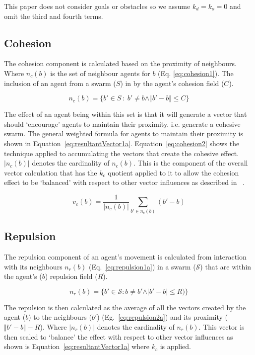 \documentclass[12pt,a4paper]{IEEEtran}
\newcommand{\magn}[1]{\Vert{#1}\Vert}
\newcommand{\card}[1]{\vert{#1}\vert}
\newcommand{\vbb}[2]{#2-#1}
\newcommand{\kc}{\mathit{k_c}}
\newcommand{\kd}{\mathit{k_d}}
\newcommand{\ko}{\mathit{k_o}}
\newcommand{\rb}{\mathit{R}}
\begin{document}
This paper does not consider goals or obstacles so we assume $\kd = \ko = 0$ and omit the third and fourth terms.

\subsection{Cohesion}\label{cohesion}
The cohesion component is calculated based on the proximity of neighbours. Where $n_c(b)$ is the set of neighbour agents for $b$ (Eq. \ref{eq:cohesion1}). The inclusion of an agent from a swarm ($S$) in by the agent's cohesion field ($C$).

\begin{equation}\label{eq:cohesion1}
n_c(b) = \{b' \in S~:~b' \neq b \land\magn{\vbb{b}{b'}} \leq C\}
\end{equation}

The effect of an agent being within this set is that it will generate a vector that should `encourage' agents to maintain their proximity. i.e. generate a cohesive swarm. The general weighted formula for agents to maintain their proximity is shown in Equation~\ref{eq:resultantVector1a}. Equation~\ref{eq:cohesion2} shows the technique applied to accumulating the vectors that create the cohesive effect. $\card{n_c(b)}$ denotes the cardinality of $n_c(b)$. This is the component of the overall vector calculation that has the $\kc$ quotient applied to it to allow the cohesion effect to be `balanced' with respect to other vector influences as described in ~\cite{eliot2017methods,eliot2018metric,eliot2019void}. 

\begin{equation}\label{eq:cohesion2}
v_c(b) = \frac{1}{\card{n_c(b)}} \sum_{b' \in n_c(b)}(\vbb{b}{b'})
\end{equation}

\subsection{Repulsion}\label{repulsion:neighbours}
The repulsion component of an agent's movement is calculated from interaction with its neighbours $n_r(b)$ (Eq.~\ref{eq:repulsion1a}) in a swarm ($\mathcal{S}$) that are within the agent's ($b$) repulsion field ($\rb$).

\begin{equation}\label{eq:repulsion1a}
n_r(b) = \{b' \in \mathcal{S} : b \neq b' \land \card{\vbb{b}{b'}} \leq \rb)\}
\end{equation}

The repulsion is then calculated as the average of all the vectors created by the agent ($b$) to the neighbours ($b'$) (Eg.~\ref{eq:repulsion2a}) and its proximity ($\magn{\vbb{b}{b'}} - \rb$). Where $\card{n_r(b)}$ denotes the cardinality of $n_r(b)$. This vector is then scaled to `balance' the effect with respect to other vector influences as shown is Equation~\ref{eq:resultantVector1a} where $\kc$ is applied.
\end{document}
